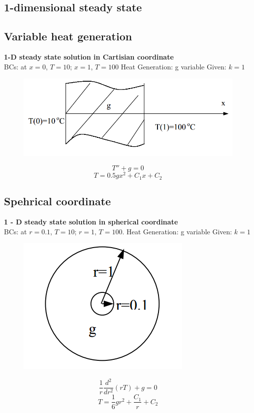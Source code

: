 \begin{appendices}



\section{1-dimensional steady state}
\subsection{Variable heat generation}
\begin{example}
\textbf{1-D steady state solution in Cartisian coordinate}\\
BCs: at $x=0$, $T=10$; 
$x=1$, $T=100$ Heat Generation: g variable Given: $k=1$
\begin{figure}[H]
  \centering
    \includegraphics[scale=0.5]{figures/appendixA/1}
\end{figure}
$$T''+g=0$$
$$T=0.5gx^2+C_1x+C_2$$
\end{example}

\subsection{Spehrical coordinate}
\begin{example}
\textbf{1 - D steady state solution in spherical coordinate}\\
BCs: at $r = 0.1$, $T = 10$; $r = 1$, $T = 100$.
Heat Generation: g variable
Given: $k=1$
\begin{figure}[H]
  \centering
    \includegraphics[scale=0.5]{figures/appendixA/2}
\end{figure}
$$\frac{1}{r}\frac{d^2}{dr^2}(rT)+g=0$$
$$T=\frac{1}{6}gr^2+\frac{C_1}{r}+C_2$$
\end{example}


\end{appendices}
